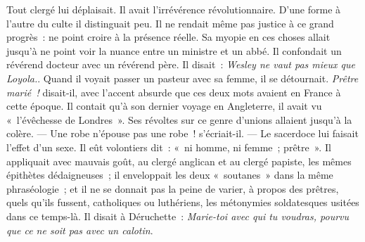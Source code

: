 \documentclass[french,twoside]{book} %
\begin{document}
Tout clergé lui déplaisait. Il avait l’irrévérence révolutionnaire. D’une forme à l’autre du culte il distinguait peu. Il ne rendait même pas justice à ce grand  progrès : ne point croire à la présence réelle. Sa myopie en ces choses allait jusqu’à ne point voir la nuance entre un ministre et un abbé. Il confondait un révérend docteur avec un révérend père. Il disait : \emph{Wesley ne vaut pas mieux que Loyola.}. Quand il voyait passer un pasteur avec sa femme, il se détournait. \emph{Prêtre marié !} disait-il, avec l’accent absurde que ces deux mots avaient en France à cette époque. Il contait qu’à son dernier voyage en Angleterre, il avait vu « l’évêchesse de Londres ». Ses révoltes sur ce genre d’unions allaient jusqu’à la colère. — Une robe n’épouse pas une robe ! s’écriait-il. — Le sacerdoce lui faisait l’effet d’un sexe. Il eût volontiers dit : « ni homme, ni femme ; prêtre ». Il appliquait avec mauvais goût, au clergé anglican et au clergé papiste, les mêmes épithètes dédaigneuses ; il enveloppait les deux « soutanes » dans la même phraséologie ; et il ne se donnait pas la peine de varier, à propos des prêtres, quels qu’ils fussent, catholiques ou luthériens, les métonymies soldatesques usitées dans ce temps-là. Il disait à Déruchette : \emph{Marie-toi avec qui tu voudras, pourvu que ce ne soit pas avec un calotin}.
\end{document}
